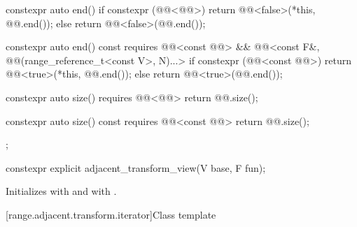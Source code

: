 \begin{codeblock}
{{    constexpr auto end() {
      if constexpr (@@<@@>) {
        return @@<false>(*this, @@.end());
      } else {
        return @@<false>(@@.end());
      }
    }

    constexpr auto end() const
      requires @@<const @@> &&
               @@<const F&, @@(range_reference_t<const V>, N)...> {
      if constexpr (@@<const @@>) {
        return @@<true>(*this, @@.end());
      } else {
        return @@<true>(@@.end());
      }
    }

    constexpr auto size() requires @@<@@> {
      return @@.size();
    }

    constexpr auto size() const requires @@<const @@> {
      return @@.size();
    }
  };
}
\end{codeblock}

\begin{itemdecl}
constexpr explicit adjacent_transform_view(V base, F fun);
\end{itemdecl}

\begin{itemdescr}
\pnum
\effects
Initializes  with  and
 with .
\end{itemdescr}

[range.adjacent.transform.iterator]{Class template }

